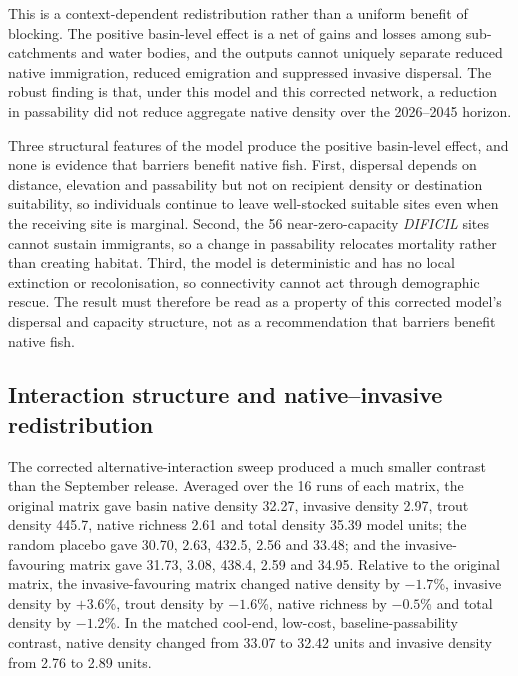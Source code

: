 \documentclass[11pt,a4paper]{article}
\begin{document}
This is a context-dependent redistribution rather than a uniform benefit of blocking. The positive basin-level effect is a net of gains and losses among sub-catchments and water bodies, and the outputs cannot uniquely separate reduced native immigration, reduced emigration and suppressed invasive dispersal. The robust finding is that, under this model and this corrected network, a reduction in passability did not reduce aggregate native density over the 2026--2045 horizon.

Three structural features of the model produce the positive basin-level effect, and none is evidence that barriers benefit native fish. First, dispersal depends on distance, elevation and passability but not on recipient density or destination suitability, so individuals continue to leave well-stocked suitable sites even when the receiving site is marginal. Second, the 56 near-zero-capacity \textit{DIFICIL} sites cannot sustain immigrants, so a change in passability relocates mortality rather than creating habitat. Third, the model is deterministic and has no local extinction or recolonisation, so connectivity cannot act through demographic rescue. The result must therefore be read as a property of this corrected model's dispersal and capacity structure, not as a recommendation that barriers benefit native fish.

\subsection{Interaction structure and native--invasive redistribution}
\label{sec:interaction}

The corrected alternative-interaction sweep produced a much smaller contrast than the September release. Averaged over the 16 runs of each matrix, the original matrix gave basin native density 32.27, invasive density 2.97, trout density 445.7, native richness 2.61 and total density 35.39 model units; the random placebo gave 30.70, 2.63, 432.5, 2.56 and 33.48; and the invasive-favouring matrix gave 31.73, 3.08, 438.4, 2.59 and 34.95. Relative to the original matrix, the invasive-favouring matrix changed native density by $-1.7$\%, invasive density by $+3.6$\%, trout density by $-1.6$\%, native richness by $-0.5$\% and total density by $-1.2$\%. In the matched cool-end, low-cost, baseline-passability contrast, native density changed from 33.07 to 32.42 units and invasive density from 2.76 to 2.89 units.
\end{document}
